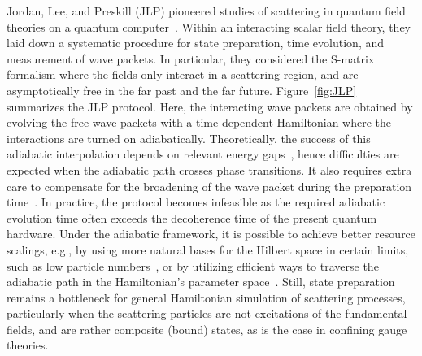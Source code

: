 \documentclass[a4paper,onecolumn,11pt,accepted=2024-10-11]{quantumarticle}
\begin{document}
Jordan, Lee, and Preskill (JLP) pioneered studies of scattering in quantum field theories on a quantum computer~\cite{Jordan:2012xnu, Jordan:2011ci}. Within an interacting scalar field theory, they laid down a systematic procedure for state preparation, time evolution, and measurement of wave packets. In particular, they considered the S-matrix formalism where the fields only interact in a scattering region, and are asymptotically free in the far past and the far future. Figure~\ref{fig:JLP} summarizes the JLP protocol. Here, the interacting wave packets are obtained by evolving the free wave packets with a time-dependent Hamiltonian where the interactions are turned on adiabatically. Theoretically, the success of this adiabatic interpolation depends on relevant energy gaps~\cite{Farhi:2000ikn}, hence difficulties are expected when the adiabatic path crosses phase transitions. It also requires extra care to compensate for the broadening of the wave packet during the preparation time~\cite{Jordan:2012xnu}. In practice, the protocol becomes infeasible as the required adiabatic evolution time often exceeds the decoherence time of the present quantum hardware. Under the adiabatic framework, it is possible to achieve better resource scalings, e.g., by using more natural bases for the Hilbert space in certain limits, such as low particle numbers~\cite{Barata:2020jtq}, or by utilizing efficient ways to traverse the adiabatic path in the Hamiltonian's parameter space~\cite{Cohen:2023dll}. Still, state preparation remains a bottleneck for general Hamiltonian simulation of scattering processes, particularly when the scattering particles are not excitations of the fundamental fields, and are rather composite (bound) states, as is the case in confining gauge theories.
\end{document}

